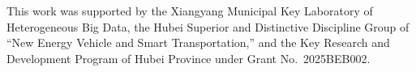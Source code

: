 This work was supported by the Xiangyang Municipal Key Laboratory of Heterogeneous Big Data, the Hubei Superior and Distinctive Discipline Group of ``New Energy Vehicle and Smart Transportation,'' and the Key Research and Development Program of Hubei Province under Grant No.~2025BEB002.
